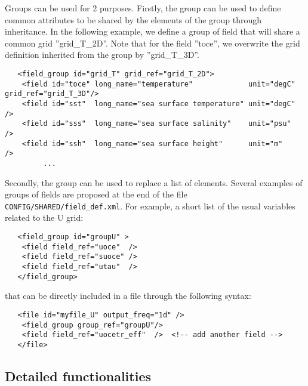 \documentclass[NEMO_book]{subfiles}
\begin{document}
Groups can be used for 2 purposes. Firstly, the group can be used to define common attributes to be shared by the elements of the group through inheritance. In the following example, we define a group of field that will share a common grid ''grid\_T\_2D''. Note that for the field ''toce'', we overwrite the grid definition inherited from the group by ''grid\_T\_3D''.
\vspace{-20pt}
\begin{alltt}  {{\scriptsize
\begin{verbatim}
   <field_group id="grid_T" grid_ref="grid_T_2D">
    <field id="toce" long_name="temperature"             unit="degC" grid_ref="grid_T_3D"/>
    <field id="sst"  long_name="sea surface temperature" unit="degC"                     />
    <field id="sss"  long_name="sea surface salinity"    unit="psu"                      />
    <field id="ssh"  long_name="sea surface height"      unit="m"                        />
         ...
\end{verbatim}
}}\end{alltt} 

Secondly, the group can be used to replace a list of elements. Several examples of groups of fields are proposed at the end of the file {\tt CONFIG/SHARED/field\_def.xml}. For example, a short list of the usual variables related to the U grid:
\vspace{-20pt}
\begin{alltt}  {{\scriptsize
\begin{verbatim}
   <field_group id="groupU" >
    <field field_ref="uoce"  />
    <field field_ref="suoce" />
    <field field_ref="utau"  />
   </field_group>
\end{verbatim}
}}\end{alltt} 
that can be directly included in a file through the following syntax:
\vspace{-20pt}
\begin{alltt}  {{\scriptsize
\begin{verbatim}
   <file id="myfile_U" output_freq="1d" />   
    <field_group group_ref="groupU"/>  
    <field field_ref="uocetr_eff"  />  <!-- add another field -->
   </file>   
\end{verbatim}
}}\end{alltt} 

\subsection{Detailed functionalities }
\end{document}
